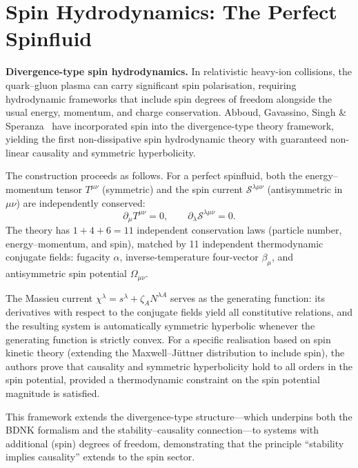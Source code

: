 \section{Spin Hydrodynamics: The Perfect Spinfluid}
\label{sec:spin-hydro}

\begin{relcorrection}
\textbf{Divergence-type spin hydrodynamics.}
In relativistic heavy-ion collisions, the quark--gluon plasma can carry
significant spin polarisation, requiring hydrodynamic frameworks that
include spin degrees of freedom alongside the usual energy, momentum,
and charge conservation.  Abboud, Gavassino, Singh \&
Speranza~\cite{AbboudGavassinoSinghSperanzaSpinfluid2025} have
incorporated spin into the divergence-type theory framework, yielding
the first non-dissipative spin hydrodynamic theory with guaranteed
non-linear causality and symmetric hyperbolicity.

The construction proceeds as follows.  For a perfect spinfluid, both
the energy--momentum tensor $T^{\mu\nu}$ (symmetric) and the spin
current $\mathcal{S}^{\lambda\mu\nu}$ (antisymmetric in $\mu\nu$)
are independently conserved:
\begin{equation}
  \partial_\mu T^{\mu\nu} = 0, \qquad
  \partial_\lambda \mathcal{S}^{\lambda\mu\nu} = 0.
  \label{eq:spinfluid-conservation}
\end{equation}
The theory has $1 + 4 + 6 = 11$ independent conservation laws
(particle number, energy--momentum, and spin), matched by 11
independent thermodynamic conjugate fields: fugacity $\alpha$,
inverse-temperature four-vector $\beta_\mu$, and antisymmetric spin
potential $\Omega_{\mu\nu}$.

The Massieu current $\chi^\lambda = s^\lambda + \zeta_A N^{\lambda A}$
serves as the generating function: its derivatives with respect to the
conjugate fields yield all constitutive relations, and the resulting
system is automatically symmetric hyperbolic whenever the generating
function is strictly convex.  For a specific realisation based on spin
kinetic theory (extending the Maxwell--J\"uttner distribution to
include spin), the authors prove that causality and symmetric
hyperbolicity hold to all orders in the spin potential, provided a
thermodynamic constraint on the spin potential magnitude is satisfied.

This framework extends the divergence-type structure---which underpins
both the BDNK formalism and the stability--causality connection---to
systems with additional (spin) degrees of freedom, demonstrating that
the principle ``stability implies causality'' extends to the spin
sector.
\end{relcorrection}

